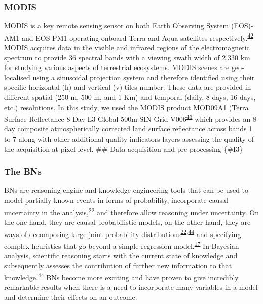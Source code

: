 \documentclass[12pt,oneside]{article}
\begin{document}
\hypertarget{I22}{%
\subsubsection{MODIS}\label{I22}}

MODIS is a key remote sensing sensor on both Earth Observing System (EOS)-AM1 and EOS-PM1 operating onboard Terra and Aqua satellites respectively.\textsuperscript{\protect\hyperlink{ref-King_et_al_1995}{42}} MODIS acquires data in the visible and infrared regions of the electromagnetic spectrum to provide 36 spectral bands with a viewing swath width of 2,330 km for studying various aspects of terrestrial ecosystems. MODIS scenes are geo-localised using a sinusoidal projection system and therefore identified using their specific horizontal (h) and vertical (v) tiles number. These data are provided in different spatial (250 m, 500 m, and 1 Km) and temporal (daily, 8 days, 16 days, etc.) resolutions. In this study, we used the MODIS product MOD09A1 (Terra Surface Reflectance 8-Day L3 Global 500m SIN Grid V006\textsuperscript{\protect\hyperlink{ref-Vermote_2015}{43}} which provides an 8-day composite atmospherically corrected land surface reflectance across bands 1 to 7 along with other additional quality indicators layers assessing the quality of the acquisition at pixel level.
\#\# Data acquisition and pre-processing \{\#I3\}

\hypertarget{I31}{%
\subsubsection{The BNs}\label{I31}}

BNs are reasoning engine and knowledge engineering tools that can be used to model partially known events in forms of probability, incorporate causal uncertainty in the analysis,\textsuperscript{\protect\hyperlink{ref-Pourret_et_al_2008}{22}} and therefore allow reasoning under uncertainty. On the one hand, they are causal probabilistic models, on the other hand, they are ways of decomposing large joint probability distributions\textsuperscript{\protect\hyperlink{ref-Pourret_et_al_2008}{22},\protect\hyperlink{ref-Pearl_2000}{44}} and specifying complex heuristics that go beyond a simple regression model.\textsuperscript{\protect\hyperlink{ref-Whitney_et_al_2018}{17}} In Bayesian analysis, scientific reasoning starts with the current state of knowledge and subsequently assesses the contribution of further new information to that knowledge.\textsuperscript{\protect\hyperlink{ref-Pearl_2000}{44}} BNs become more exciting and have proven to give incredibly remarkable results when there is a need to incorporate many variables in a model and determine their effects on an outcome.
\end{document}

